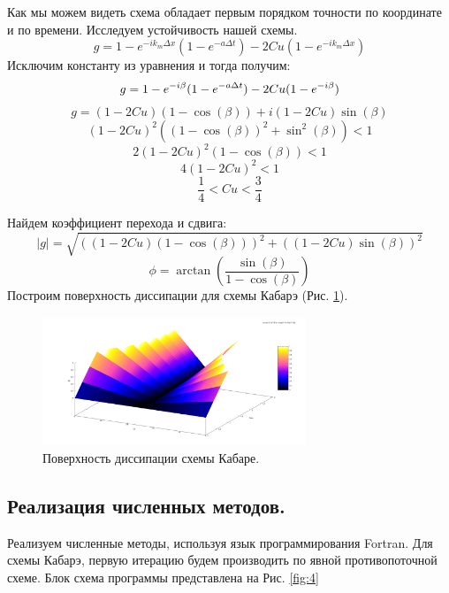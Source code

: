 Как мы можем видеть схема обладает первым порядком точности по координате и по времени. Исследуем устойчивость нашей схемы. 
\begin{equation}
    g=1-e^{-ik_m\Delta x}(1-e^{-a\Delta t})-2Cu(1-e^{-ik_m\Delta x})
\end{equation}
Исключим константу из уравнения и тогда получим:
\begin{equation}
    g=1-e^{-i\beta}(1-e^{-a\Delta t})-2Cu(1-e^{-i\beta})\\
\end{equation}
$$g=(1-2Cu)(1-\cos(\beta))+i(1-2Cu)\sin(\beta)$$
\begin{equation}
    (1-2Cu)^2((1-\cos(\beta))^2+\sin^2(\beta))<1
\end{equation}
\begin{equation}
    2(1-2Cu)^2(1-\cos(\beta))<1
\end{equation}
\begin{equation}
    4(1-2Cu)^2<1
\end{equation}
\begin{equation}
    \frac{1}{4}<Cu<\frac{3}{4}
\end{equation}

Найдем коэффициент перехода и сдвига:
$$|g|=\sqrt{((1-2Cu)(1-\cos(\beta)))^2+((1-2Cu)\sin(\beta))^2}$$
$$\phi=\arctan(\frac{\sin(\beta)}{1-\cos(\beta)})$$
Построим поверхность диссипации для схемы Кабарэ (Рис. \ref{fig:13}). 

\begin{figure}[H]
    \centering
    \includegraphics[width=0.7\textwidth]{images/15.png}
    \caption{Поверхность диссипации схемы Кабаре.}
    \label{fig:13}
\end{figure}

\subsection{Реализация численных методов.}
Реализуем численные методы, используя язык программирования Fortran. Для схемы Кабарэ, первую итерацию будем производить по явной противопоточной схеме. Блок схема программы представлена на Рис. \ref{fig:4}

